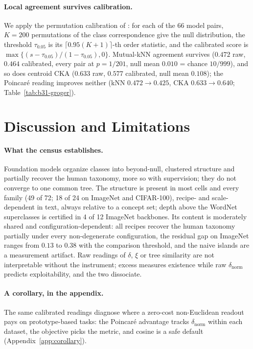 \paragraph{Local agreement survives calibration.} We apply the permutation calibration of \citet{groger2026aristotelian}: for each of the 66 model pairs, $K{=}200$ permutations of the class correspondence give the null distribution, the threshold $\tau_{0.05}$ is its $\lceil 0.95(K{+}1)\rceil$-th order statistic, and the calibrated score is $\max\{(s-\tau_{0.05})/(1-\tau_{0.05}),0\}$. Mutual-kNN agreement survives ($0.472$ raw, $0.464$ calibrated, every pair at $p=1/201$, null mean $0.010$ = chance $10/999$), and so does centroid CKA ($0.633$ raw, $0.577$ calibrated, null mean $0.108$); the Poincar\'{e} reading improves neither (kNN $0.472\to0.425$, CKA $0.633\to0.640$; Table~\ref{tab:b31-groger}). %

\section{Discussion and Limitations}
\label{sec:discussion}

\paragraph{What the census establishes.} Foundation models organize classes into beyond-null, clustered structure and partially recover the human taxonomy, more so with supervision; they do not converge to one common tree. The structure is present in most cells and every family (49 of 72; 18 of 24 on ImageNet and CIFAR-100), recipe- and scale-dependent in text, always relative to a concept set; depth above the WordNet superclasses is certified in 4 of 12 ImageNet backbones. Its content is moderately shared and configuration-dependent: all recipes recover the human taxonomy partially under every non-degenerate configuration, the residual gap on ImageNet ranges from $0.13$ to $0.38$ with the comparison threshold, and the naive islands are a measurement artifact. Raw readings of $\delta$, $\xi$ or tree similarity are not interpretable without the instrument; excess measures existence while raw $\delta_{\text{norm}}$ predicts exploitability, and the two dissociate.

\paragraph{A corollary, in the appendix.} The same calibrated readings diagnose where a zero-cost non-Euclidean readout pays on prototype-based tasks: the Poincar\'{e} advantage tracks $\delta_{\text{norm}}$ within each dataset, the objective picks the metric, and cosine is a safe default (Appendix~\ref{app:corollary}). %

